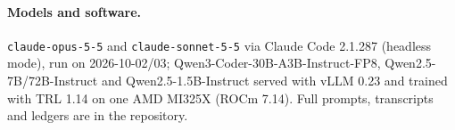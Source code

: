 \paragraph{Models and software.} \texttt{claude-opus-5-5} and \texttt{claude-sonnet-5-5} via Claude Code 2.1.287 (headless mode), run on 2026-10-02/03; Qwen3-Coder-30B-A3B-Instruct-FP8, Qwen2.5-7B/72B-Instruct and Qwen2.5-1.5B-Instruct served with vLLM 0.23 and trained with TRL 1.14 on one AMD MI325X (ROCm 7.14). Full prompts, transcripts and ledgers are in the repository.
